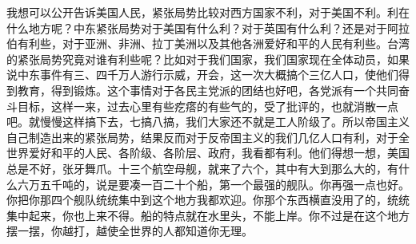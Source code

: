 我想可以公开告诉美国人民，紧张局势比较对西方国家不利，对于美国不利。利在什么地方呢？中东紧张局势对于美国有什么利？对于英国有什么利？还是对于阿拉伯有利些，对于亚洲、非洲、拉丁美洲以及其他各洲爱好和平的人民有利些。台湾的紧张局势究竟对谁有利些呢？比如对于我们国家，我们国家现在全体动员，如果说中东事件有三、四千万人游行示威，开会，这一次大概搞个三亿人口，使他们得到教育，得到锻炼。这个事情对于各民主党派的团结也好吧，各党派有一个共同奋斗目标，这样一来，过去心里有些疙瘩的有些气的，受了批评的，也就消散一点吧。就慢慢这样搞下去，七搞八搞，我们大家还不就是工人阶级了。所以帝国主义自己制造出来的紧张局势，结果反而对于反帝国主义的我们几亿人口有利，对于全世界爱好和平的人民、各阶级、各阶层、政府，我看都有利。他们得想一想，美国总是不好，张牙舞爪。十三个航空母舰，就来了六个，其中有大到那么大的，有什么六万五千吨的，说是要凑一百二十个船，第一个最强的舰队。你再强一点也好。你把你那四个舰队统统集中到这个地方我都欢迎。你那个东西横直没用了的，统统集中起来，你也上来不得。船的特点就在水里头，不能上岸。你不过是在这个地方摆一摆，你越打，越使全世界的人都知道你无理。



